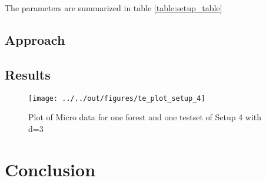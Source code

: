 \documentclass[11pt, a4paper, leqno]{article}
\begin{document}
 

The parameters are summarized in table  \ref{table:setup_table}
 \(\) \(\) \(\) \(\) \(\) {}



\subsection{Approach} %
\label{sec:sim_approach}



\subsection{Results} %
\label{sec:sim_results}
    










\begin{figure}
    \caption{Plot of Micro data for one forest and one testset of Setup 4 with d=3}
    
    \texttt{[image: ../../out/figures/te\_plot\_setup\_4]}

\end{figure}



\section{Conclusion} %
\label{sec:conclusion}

\pagebreak










\end{document}
